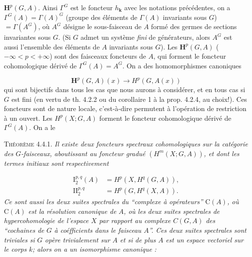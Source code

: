 \clearpage
{}

$\mathbf H^p(G,A)$. Ainsi $\Gamma^G$ est le foncteur $h_{\mathbf k}$ avec les notations
précédentes, on a
$\Gamma^G(A)=\Gamma(A)^G$ (groupe des éléments de $\Gamma(A)$ invariants sous
$G$) $=\Gamma(A^G)$, où $A^G$ désigne le sous-faisceau de $A$ formé des germes
de sections invariantes sous $G$. (Si $G$ admet un système \textit{fini} de
générateurs, alors $A^G$ est aussi l'ensemble des éléments de $A$ invariants
sous $G$).
Les $\mathbf H^p(G,A)$ ($-\infty<p<+\infty$) sont des faisceaux foncteurs de
$A$, qui forment le foncteur cohomologique dérivé de
$\Gamma^G(A)=A^G$. On a des homomorphismes canoniques

\[
\mathbf H^p(G,A)(x)\to H^p(G,A(x))
\]
qui sont bijectifs dans tous les cas que nous aurons à considérer, et en tous
cas si $G$ est fini (en vertu de th. 4.2.2 ou du corollaire 1 à la prop. 4.2.4,
au choix!). Ces foncteurs sont de nature locale, c'est-à-dire permutent à
l'opération de restriction à un ouvert.
Les $H^p(X;G,A)$ forment le foncteur cohomologique dérivé de $\Gamma^G(A)$.
On a le

\textsc{Théorème 4.4.1.} \textit{Il existe deux foncteurs spectraux
cohomologiques sur la catégorie des $G$-faisceaux, aboutissant au foncteur
gradué $(H^m(X;G,A))$, et dont les termes initiaux sont respectivement}

\[
\tag{4.4.1}
\begin{aligned}
\mathrm I_2^{p,q}(A)&=H^p(X,H^q(G,A)),\\
\mathrm {II}_2^{p,q}&=H^p(G,H^q(X,A)).
\end{aligned}
\]
\textit{Ce sont aussi les deux suites spectrales du \textup{``}complexe à opérateurs\textup{''}
$\mathrm C(A)$, où $\mathrm C(A)$ est la résolution canonique de $A$, où les deux suites
spectrales de hypercohomologie de l'espace $X$ par rapport au complexe
$C(G,A)$ des \textup{``}cochaines de $G$ à coéfficients dans le faisceau $A$\textup{''}. Ces
deux suites spectrales sont triviales si $G$ opère trivialement sur $A$ et si
de plus $A$ est un espace vectoriel sur le corps $k$; alors on a un
isomorphisme canonique :}

